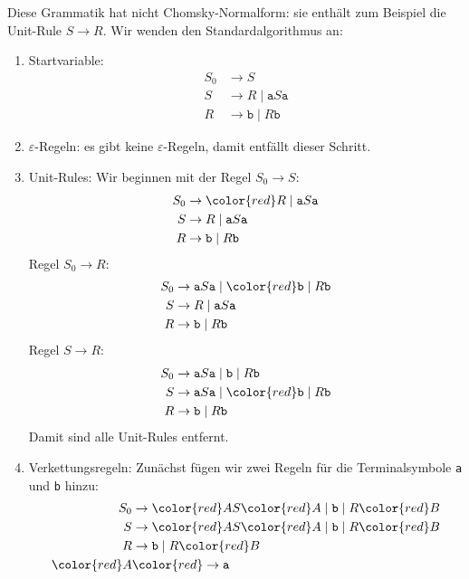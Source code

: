 \begin{loesung}
Diese Grammatik hat nicht Chomsky-Normalform: sie enthält zum Beispiel die
Unit-Rule $S\rightarrow R$.
Wir wenden den Standardalgorithmus an:
\begin{enumerate}
\item Startvariable: 
\begin{align*}
S_0&\rightarrow S                      \\
S  &\rightarrow R  \;|\; \texttt{a} S \texttt{a}\\
R  &\rightarrow \texttt{b} \;|\; R\texttt{b}
\end{align*}
\item $\varepsilon$-Regeln: es gibt keine $\varepsilon$-Regeln, damit
entfällt dieser Schritt.
\item Unit-Rules: Wir beginnen mit der Regel $S_0\rightarrow S$:
\begin{align*}
S_0&\rightarrow \color{red} R  \;|\; \texttt{a} S \texttt{a}\\
S  &\rightarrow R  \;|\; \texttt{a} S \texttt{a}\\
R  &\rightarrow \texttt{b} \;|\; R\texttt{b}
\end{align*}
Regel $S_0\rightarrow R$:
\begin{align*}
S_0&\rightarrow \texttt{a} S \texttt{a} \;|\; \color{red}\texttt{b} \;|\; R\texttt{b} \\
S  &\rightarrow R  \;|\; \texttt{a} S \texttt{a}\\
R  &\rightarrow \texttt{b} \;|\; R\texttt{b}
\end{align*}
Regel $S\rightarrow R$:
\begin{align*}
S_0&\rightarrow \texttt{a} S \texttt{a} \;|\; \texttt{b} \;|\; R\texttt{b} \\
S  &\rightarrow \texttt{a} S \texttt{a} \;|\; \color{red} \texttt{b} \;|\; R\texttt{b}\\
R  &\rightarrow \texttt{b} \;|\; R\texttt{b}
\end{align*}
Damit sind alle Unit-Rules entfernt.
\item Verkettungsregeln: Zunächst fügen wir zwei Regeln für die
Terminalsymbole \texttt{a} und \texttt{b} hinzu:
\begin{align*}
S_0&\rightarrow {\color{red}A}S{\color{red}A} \;|\; \texttt{b} \;|\; R{\color{red}B} \\
S  &\rightarrow {\color{red}A}S{\color{red}A} \;|\; \texttt{b} \;|\; R{\color{red}B} \\
R  &\rightarrow \texttt{b} \;|\; R{\color{red}B} \\
\color{red}A  &\color{red}\rightarrow \texttt{a} \\

\end{align*}
\end{enumerate}
\end{loesung}
